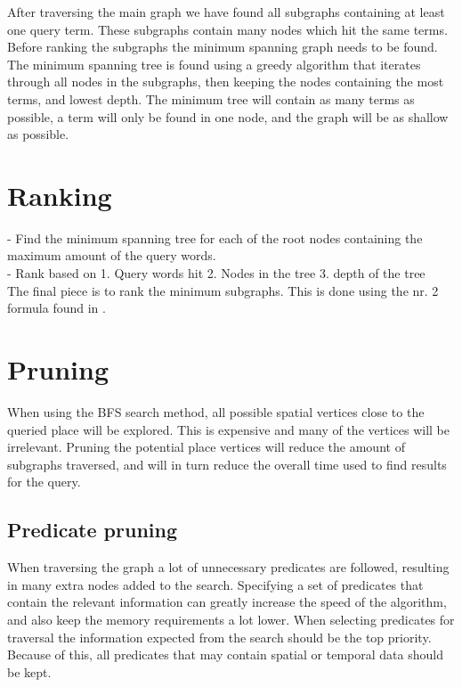 After traversing the main graph we have found all subgraphs containing at least one query term. These subgraphs contain many nodes which hit the same terms. Before ranking the subgraphs the minimum spanning graph needs to be found. The minimum spanning tree is found using a greedy algorithm that iterates through all nodes in the subgraphs, then keeping the nodes containing the most terms, and lowest depth. The minimum tree will contain as many terms as possible, a term will only be found in one node, and the graph will be as shallow as possible.

\section{Ranking}

- Find the minimum spanning tree for each of the root nodes containing the maximum amount of the query words.\\
- Rank based on 1. Query words hit 2. Nodes in the tree 3. depth of the tree\\
The final piece is to rank the minimum subgraphs. This is done using the nr. 2 formula found in \cite{Shi:2016:TRS:2882903.2882941}. 


\section{Pruning} \label{pruning}
When using the BFS search method, all possible spatial vertices close to the queried place will be explored. This is expensive and many of the vertices will be irrelevant. Pruning the potential place vertices will reduce the amount of subgraphs traversed, and will in turn reduce the overall time used to find results for the query.

\subsection{Predicate pruning}
When traversing the graph a lot of unnecessary predicates are followed, resulting in many extra nodes added to the search. Specifying a set of predicates that contain the relevant information can greatly increase the speed of the algorithm, and also keep the memory requirements a lot lower. When selecting predicates for traversal the information expected from the search should be the top priority. Because of this, all predicates that may contain spatial or temporal data should be kept.

